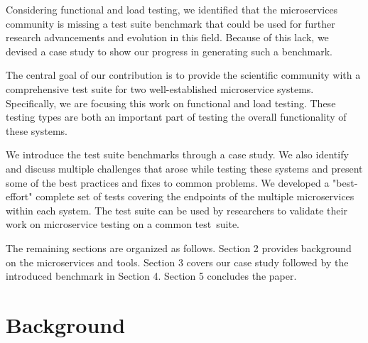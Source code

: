 
Considering functional and load testing, we identified that the microservices community is missing a test suite benchmark that could be used for further research advancements and evolution in this field. Because of this lack, we devised a case study to show our progress in generating such a benchmark.

The central goal of our contribution is to provide the scientific community with a comprehensive test suite  for two well-established microservice systems. Specifically, we are focusing this work on functional and load testing. These testing types are both an important part of testing the overall functionality of these systems. 

We introduce the test suite benchmarks through a case study. We also identify and discuss multiple challenges that arose while testing these systems and present some of the best practices and fixes to common problems. We developed a "best-effort" complete set of tests covering the endpoints of the multiple microservices within each system. The test suite can be used by researchers to validate their work on microservice testing on a common test~suite. 

The remaining sections are organized as follows. Section 2 provides background on the microservices and tools. Section 3 covers our case study followed by the introduced benchmark in Section 4. Section 5 concludes the paper.

\section{Background}\label{sec:background}


